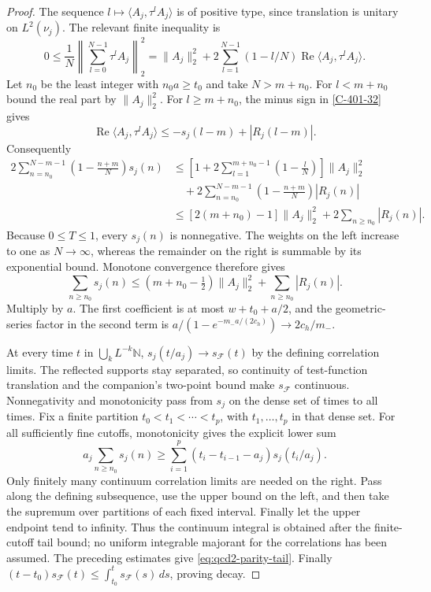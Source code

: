 \documentclass[11pt,letterpaper,reqno]{amsart}
\theoremstyle{definition}
\theoremstyle{remark}
\begin{document}
\begin{proof}
The sequence $l\mapsto\langle A_j,\tau^lA_j\rangle$
is of positive type, since translation is unitary
on $L^2(\nu_j)$. The relevant finite inequality is
\[
 0\le\frac1N\left\|\sum_{l=0}^{N-1}\tau^lA_j\right\|_2^2
 =\|A_j\|_2^2+
       2\sum_{l=1}^{N-1}(1-l/N)
                     \operatorname{Re}\langle A_j,\tau^lA_j\rangle.
\]
Let $n_0$ be the least integer with $n_0a\ge t_0$ and
take $N>m+n_0$. For $l<m+n_0$ bound the real part by
$\|A_j\|_2^2$. For $l\ge m+n_0$, the minus sign in
\eqref{C-401-32} gives
\[
 \operatorname{Re}\langle A_j,\tau^lA_j\rangle
       \le-s_j(l-m)+|R_j(l-m)|.
\]
Consequently
\begin{align*}
 2\sum_{n=n_0}^{N-m-1}\left(1-\frac{n+m}{N}\right)s_j(n)
 &\le \left[1+2\sum_{l=1}^{m+n_0-1}
                   \left(1-\frac lN\right)\right]\|A_j\|_2^2\\
 &\quad+2\sum_{n=n_0}^{N-m-1}
              \left(1-\frac{n+m}{N}\right)|R_j(n)|\\
 &\le[2(m+n_0)-1]\|A_j\|_2^2
                         +2\sum_{n\ge n_0}|R_j(n)|.
\end{align*}
Because $0\le T\le1$, every $s_j(n)$ is nonnegative.
The weights on the left increase to one as $N\to\infty$,
whereas the remainder on the right is summable by its
exponential bound. Monotone convergence therefore gives
\[
 \sum_{n\ge n_0}s_j(n)
 \le(m+n_0-\tfrac12)\|A_j\|_2^2
                                      +\sum_{n\ge n_0}|R_j(n)|.
\]
Multiply by $a$. The first coefficient is at most
$w+t_0+a/2$, and the geometric-series factor in
the second term is
$a/(1-e^{-m_-a/(2c_h)})\to2c_h/m_-$.

At every time $t$ in $\bigcup_kL^{-k}\mathbb N$,
$s_j(t/a_j)\to s_{\mathcal F}(t)$ by the defining
correlation limits. The reflected supports stay
separated, so continuity of test-function translation
and the companion's two-point bound make
$s_{\mathcal F}$ continuous. Nonnegativity and
monotonicity pass from $s_j$ on the dense set of
times to all times. Fix a finite partition
$t_0<t_1<\cdots<t_p$, with $t_1,\ldots,t_p$ in that
dense set. For all sufficiently fine cutoffs, monotonicity
gives the explicit lower sum
\[
 a_j\sum_{n\ge n_0}s_j(n)
    \ge\sum_{i=1}^p(t_i-t_{i-1}-a_j)s_j(t_i/a_j).
\]
Only finitely many continuum correlation limits are needed
on the right. Pass along the defining subsequence, use
the upper bound on the left, and then take the supremum
over partitions of each fixed interval. Finally let the
upper endpoint tend to infinity. Thus the continuum
integral is obtained after the finite-cutoff tail bound;
no uniform integrable majorant for the correlations has
been assumed. The preceding estimates give
\eqref{eq:qcd2-parity-tail}. Finally
$(t-t_0)s_{\mathcal F}(t)\le\int_{t_0}^t
s_{\mathcal F}(s)\,ds$, proving decay.
\end{proof}
\end{document}
